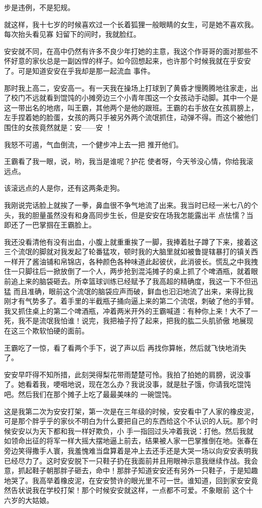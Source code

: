 \documentclass{article}
\begin{document}
步是违例，不是犯规。 

就这样，我十七岁的时候喜欢过一个长着狐狸一般眼睛的女生，可是她不喜欢我。每次抬头看见寡
妇留下的间时，我就脸红。 

安安就不同，在高中仍然有许多不良少年打她的主意，我这个作哥哥的面对那些不怀好意的家伙总是一副凶悍的样子。如今回想起来，也许那个时候我就在乎安安了。可是知道安安在乎我却是那一起流血
事件。 

那时我上高二，安安高一。有一天我在操场上打球到了黄昏才慢腾腾地往家走，出了校门不远就看到馄饨的小摊旁边三个小青年围这一个女孩动手动脚。其中一个是这一带出名的地痞，叫王霸，其他两个是他的跟班。王霸的右手放在女孩肩膀上，左手捏着她的脸蛋，女孩的两只手被另外两个流氓抓住，动弹不得。而这个被他们围住的女孩竟然就是：安——安
！ 

\newpage

我怒不可遏，气血倒流，一个健步冲上去一把
推开他们。 

王霸看了我一眼，说，哟，我当是谁呢？护花
使者呀，今天爷没心情，你给我滚远点。 


该滚远点的人是你，还有这两条走狗。 

我刚说完话脸上就挨了一拳，鼻血很不争气地流了出来。我当时已经一米七八的个头，我的胆量虽然没有和身高同步生长，但是安安在场我怎能露出半
点怯懦？当即还了一巴掌掴在王霸脸上。 

我还没看清他有没有出血，小腹上就重重挨了一脚，我捧着肚子蹲了下来，接着这三个流氓的脚就对我发起了轮番猛攻，顿时我的大脑里就如被鲁提辖暴打的镇关西一样开了酱油铺和帛锦店，各种颜色各种味道此起彼伏，此消彼长。慌乱之中我拽住一只脚往后一掀放倒了一个人，两步抢到混沌摊子的桌上抓了个啤酒瓶，就着眼前追上来的脑袋砸去。所幸篮球训练已经赋予了我高超的精确度，我这一下不但迅猛
\newpage
而且准确，眼前这个流氓的脑袋应声而破，鲜血也汩汩地流了出来，来得比我刚才有气势多了。着手里的半截瓶子捅向逼上来的第二个流氓，刺破了他的手臂。我又抓住桌上的第二个啤酒瓶，冲着两米开外的王霸喊道：有种你上来！大不了一死，我不是流氓我怕谁！说完，我把袖子捋了起来，把我的肱二头肌骄傲
地展现在这三个欺软怕硬的面前。 

王霸吃了一惊，看了看两个手下，说了声以后
再找你算帐，然后就飞快地消失了。 

安安早吓得不知所措，此刻哭得梨花带雨楚楚可怜。我拍了拍她的肩膀，说没事了。她看着我，哽咽地说，现在怎么办？我说没事，就是肚子饿，你请我吃馄饨吧。然后我们在那个摊子上吃了最最美味的
一碗馄饨。 

这是我第二次为安安打架，第一次是在三年级的时候，安安看中了人家的橡皮泥，可是那个胖乎乎的家伙不明白为什么要把自己的东西给这个不认识的人玩。那个时候安安以为天下都和我一样好欺负，小
\newpage
手一指回过头冲着我说：打他。然后我就如领命出征的将军一样大摇大摆地逼上前去，结果被人家一巴掌推倒在地。张春在旁边笑得撒手人寰，我羞愧难当盘算着是冲上去还手还是大哭一场以向安安表明我已经尽力了。这时安安脱下一只鞋子扔在我面前并且用眼神示意我继续作战。我会意，抓起鞋子朝那胖子砸去，命中！那胖子知道安安还有另外一只鞋子，于是知趣地哭了。我高举着橡皮泥，在安安赞许的眼光里不可一世。谁知道，回到家安安竟然告状说我在学校打架！那个时候安安就这样，一点都不可爱。不象眼前
这个十六岁的大姑娘。 
\end{document}
